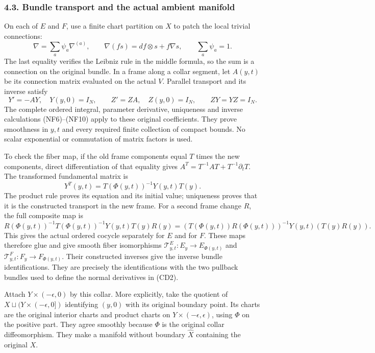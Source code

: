 \documentclass[
  11pt,
]{article}
\begin{document}
\subsubsection{4.3. Bundle transport and the actual ambient
manifold}\label{bundle-transport-and-the-actual-ambient-manifold}

On each of \(E\) and \(F\), use a finite chart partition on \(X\) to
patch the local trivial connections: \[
 \nabla=\sum_a\psi_a\nabla^{(a)},\qquad
 \nabla(fs)=df\otimes s+f\nabla s,\qquad\sum_a\psi_a=1.
 \tag{CJ11}
\] The last equality verifies the Leibniz rule in the middle formula, so
the sum is a connection on the original bundle. In a frame along a
collar segment, let \(A(y,t)\) be its connection matrix evaluated on the
actual \(V\). Parallel transport and its inverse satisfy \[
 Y'=-AY,\quad Y(y,0)=I_N,\qquad
 Z'=ZA,\quad Z(y,0)=I_N,\qquad
 ZY=YZ=I_N.
 \tag{CJ12}
\] The complete ordered integral, parameter derivative, uniqueness and
inverse calculations (NF6)--(NF10) apply to these original coefficients.
They prove smoothness in \(y,t\) and every required finite collection of
compact bounds. No scalar exponential or commutation of matrix factors
is used.

To check the fiber map, if the old frame components equal \(T\) times
the new components, direct differentiation of that equality gives
\(A^T=T^{-1}AT+T^{-1}\partial_tT\). The transformed fundamental matrix
is \[
 Y^T(y,t)=T(\Phi(y,t))^{-1}Y(y,t)T(y).
 \tag{CJ13}
\] The product rule proves its equation and its initial value;
uniqueness proves that it is the constructed transport in the new frame.
For a second frame change \(R\), the full composite map is \[
 R(\Phi(y,t))^{-1}T(\Phi(y,t))^{-1}Y(y,t)T(y)R(y)
       =(T(\Phi(y,t))R(\Phi(y,t)))^{-1}
                       Y(y,t)(T(y)R(y)).
 \tag{CJ13a}
\] This gives the actual ordered cocycle separately for \(E\) and for
\(F\). These maps therefore glue and give smooth fiber isomorphisms
\(\mathcal T^E_{y,t}:E_y\to E_{\Phi(y,t)}\) and
\(\mathcal T^F_{y,t}:F_y\to F_{\Phi(y,t)}\). Their constructed inverses
give the inverse bundle identifications. They are precisely the
identifications with the two pullback bundles used to define the normal
derivatives in (CD2).

Attach \(Y\times(-\epsilon,0)\) by this collar. More explicitly, take
the quotient of \(X\sqcup(Y\times(-\epsilon,0])\) identifying \((y,0)\)
with its original boundary point. Its charts are the original interior
charts and product charts on \(Y\times(-\epsilon,\epsilon)\), using
\(\Phi\) on the positive part. They agree smoothly because \(\Phi\) is
the original collar diffeomorphism. They make a manifold without
boundary \(\widehat X\) containing the original \(X\).
\end{document}
